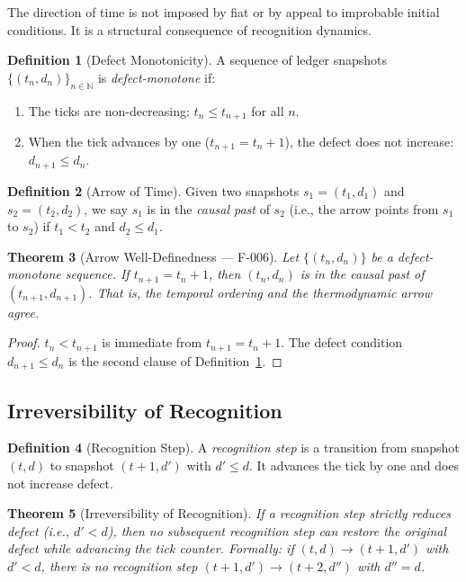 \documentclass[12pt,a4paper]{article}
\newtheorem{theorem}{Theorem}[section]
\theoremstyle{definition}
\newtheorem{definition}[theorem]{Definition}
\theoremstyle{remark}
\begin{document}
The direction of time is not imposed by fiat or by appeal to improbable
initial conditions.  It is a structural consequence of recognition dynamics.

\begin{definition}[Defect Monotonicity]
\label{def:monotone}
A sequence of ledger snapshots $\{(t_n, d_n)\}_{n \in \mathbb{N}}$ is
\emph{defect-monotone} if:
\begin{enumerate}[label=(\roman*)]
  \item The ticks are non-decreasing: $t_n \leq t_{n+1}$ for all $n$.
  \item When the tick advances by one ($t_{n+1} = t_n + 1$), the defect
    does not increase: $d_{n+1} \leq d_n$.
\end{enumerate}
\end{definition}

\begin{definition}[Arrow of Time]
\label{def:arrow}
Given two snapshots $s_1 = (t_1, d_1)$ and $s_2 = (t_2, d_2)$, we say
$s_1$ is in the \emph{causal past} of $s_2$ (i.e., the arrow points from
$s_1$ to $s_2$) if $t_1 < t_2$ and $d_2 \leq d_1$.
\end{definition}

\begin{theorem}[Arrow Well-Definedness --- F-006]
\label{thm:arrow}
Let $\{(t_n, d_n)\}$ be a defect-monotone sequence.  If $t_{n+1} =
t_n + 1$, then $(t_n, d_n)$ is in the causal past of $(t_{n+1}, d_{n+1})$.
That is, the temporal ordering and the thermodynamic arrow agree.
\end{theorem}

\begin{proof}
$t_n < t_{n+1}$ is immediate from $t_{n+1} = t_n + 1$.  The defect
condition $d_{n+1} \leq d_n$ is the second clause of
Definition~\ref{def:monotone}.
\end{proof}

\subsection{Irreversibility of Recognition}

\begin{definition}[Recognition Step]
\label{def:rec-step}
A \emph{recognition step} is a transition from snapshot $(t, d)$ to
snapshot $(t+1, d')$ with $d' \leq d$.  It advances the tick by one and
does not increase defect.
\end{definition}

\begin{theorem}[Irreversibility of Recognition]
\label{thm:irreversible}
If a recognition step strictly reduces defect (i.e., $d' < d$), then no
subsequent recognition step can restore the original defect while advancing
the tick counter.  Formally: if $(t, d) \to (t+1, d')$ with $d' < d$,
there is no recognition step $(t+1, d') \to (t+2, d'')$ with $d'' = d$.
\end{theorem}
\end{document}
